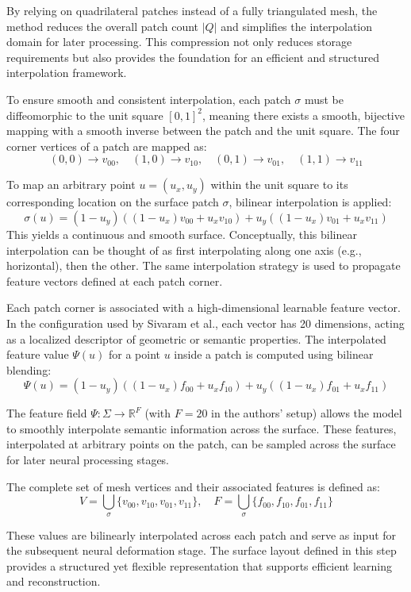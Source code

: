 By relying on quadrilateral patches instead of a fully triangulated mesh, the method reduces the overall patch count $|Q|$ and simplifies the interpolation domain for later processing.  
This compression not only reduces storage requirements but also provides the foundation for an efficient and structured interpolation framework.  

To ensure smooth and consistent interpolation, each patch $\sigma$ must be diffeomorphic to the unit square $[0,1]^2$, meaning there exists a smooth, bijective mapping with a smooth inverse between the patch and the unit square.  
The four corner vertices of a patch are mapped as:
\[(0,0)\rightarrow v_{00}, \quad (1,0)\rightarrow v_{10}, \quad (0,1)\rightarrow v_{01}, \quad (1,1)\rightarrow v_{11}\]

To map an arbitrary point $u = (u_x, u_y)$ within the unit square to its corresponding location on the surface patch $\sigma$, bilinear interpolation is applied:  
\[\sigma(u) = (1 - u_y)((1 - u_x)v_{00} + u_x v_{10}) + u_y((1 - u_x)v_{01} + u_x v_{11}) \tag{1}\]  
This yields a continuous and smooth surface.  
Conceptually, this bilinear interpolation can be thought of as first interpolating along one axis (e.g., horizontal), then the other.  
The same interpolation strategy is used to propagate feature vectors defined at each patch corner.  

Each patch corner is associated with a high-dimensional learnable feature vector.  
In the configuration used by Sivaram et al., each vector has 20 dimensions, acting as a localized descriptor of geometric or semantic properties.  
The interpolated feature value $\Psi(u)$ for a point $u$ inside a patch is computed using bilinear blending:  
\[\Psi(u) = (1 - u_y)((1 - u_x)f_{00} + u_x f_{10}) + u_y((1 - u_x)f_{01} + u_x f_{11}) \tag{2}\]

The feature field $\Psi: \Sigma \rightarrow \mathbb{R}^F$ (with $F = 20$ in the authors' setup) allows the model to smoothly interpolate semantic information across the surface.  
These features, interpolated at arbitrary points on the patch, can be sampled across the surface for later neural processing stages.  

The complete set of mesh vertices and their associated features is defined as:  
\[V = \bigcup_\sigma \{v_{00}, v_{10}, v_{01}, v_{11}\}, \quad F = \bigcup_\sigma \{f_{00}, f_{10}, f_{01}, f_{11}\}\]  

These values are bilinearly interpolated across each patch and serve as input for the subsequent neural deformation stage.  
The surface layout defined in this step provides a structured yet flexible representation that supports efficient learning and reconstruction.  

